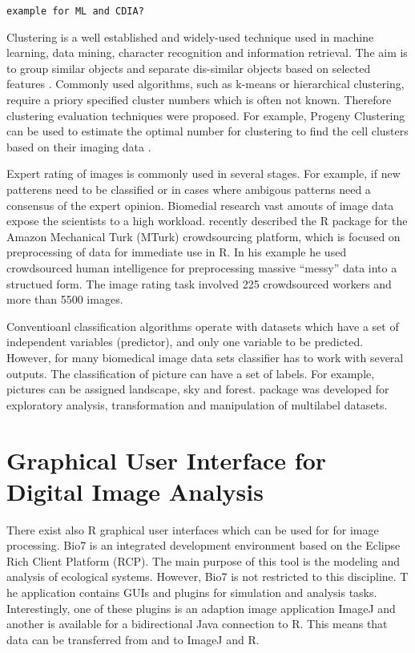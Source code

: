 \texttt{example for ML and CDIA?}

Clustering is a well established and widely-used technique used in machine 
learning, data mining, character recognition and information retrieval. The aim 
is to group similar objects and separate dis-similar objects based on selected 
features \citep{szkaliczki_clustering._2016, hu_progenyclust:_2016}.  Commonly 
used algorithms, such as k-means or hierarchical clustering, require a priory 
specified cluster numbers which is often not known. Therefore clustering 
evaluation techniques were proposed. For example, Progeny Clustering can be used 
to estimate the optimal number for clustering to find the cell clusters based on 
their imaging data \citep{hu_progenyclust:_2016}.

Expert rating of images is commonly used in several stages. For example, if new 
patterens need to be classified or in cases where ambigous patterns need a 
consensus of the expert opinion. Biomedial research vast amouts of image data 
expose the scientists to a high workload. \citet{leeper_crowdsourced_2016} 
recently described the R package  for the Amazon Mechanical Turk 
(MTurk) crowdsourcing platform, which is focused on preprocessing of data for 
immediate use in R. In his example he used crowdsourced human intelligence for 
preprocessing massive ``messy'' data into a structued form. The image rating 
task involved 225 crowdsourced workers and more than 5500 images.

Conventioanl classification algorithms operate with datasets which have a set 
of independent variables (predictor), and only one variable to be predicted. 
However, for many biomedical image data sets classifier has to work with 
several outputs. The classification of picture can have a set of labels. For 
example, pictures can be assigned landscape, sky and forest.  
package \citep{charte_working_2015} was developed for exploratory analysis, 
transformation and manipulation of multilabel datasets.

\section{Graphical User Interface for Digital Image Analysis}

There exist also R graphical user interfaces \citep{rodiger_rkward:_2012} which 
can be used for for image processing. Bio7 is an integrated development 
environment based on the Eclipse Rich Client Platform (RCP). The main purpose of 
this tool is the modeling and analysis of ecological systems. However, Bio7 is 
not restricted to this discipline. T he application contains GUIs and plugins 
for simulation and analysis tasks. Interestingly, one of these plugins is an 
adaption image application ImageJ and another is available for a bidirectional 
Java connection to R. This means that data can be transferred from and to ImageJ 
and R.

